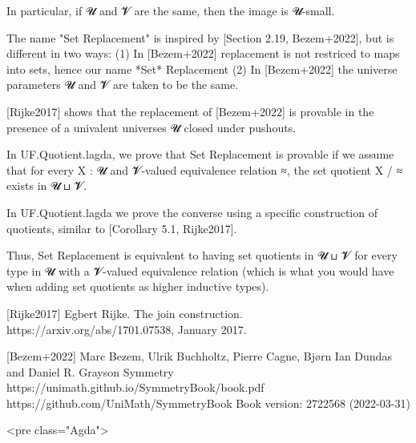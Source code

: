 In particular, if 𝓤 and 𝓥 are the same, then the image is 𝓤-small.

The name "Set Replacement" is inspired by [Section 2.19, Bezem+2022], but is
different in two ways:
(1) In [Bezem+2022] replacement is not restriced to maps into sets, hence our
    name *Set* Replacement
(2) In [Bezem+2022] the universe parameters 𝓤 and 𝓥 are taken to be the same.

[Rijke2017] shows that the replacement of [Bezem+2022] is provable in the
presence of a univalent universes 𝓤 closed under pushouts.

In UF.Quotient.lagda, we prove that Set Replacement is provable if we assume
that for every X : 𝓤 and 𝓥-valued equivalence relation ≈, the set quotient X / ≈
exists in 𝓤 ⊔ 𝓥.

In UF.Quotient.lagda we prove the converse using a specific construction of
quotients, similar to [Corollary 5.1, Rijke2017].

Thus, Set Replacement is equivalent to having set quotients in 𝓤 ⊔ 𝓥 for every
type in 𝓤 with a 𝓥-valued equivalence relation (which is what you would have
when adding set quotients as higher inductive types).

[Rijke2017]  Egbert Rijke. The join construction.
             https://arxiv.org/abs/1701.07538, January 2017.

[Bezem+2022] Marc Bezem, Ulrik Buchholtz, Pierre Cagne, Bj‌ørn Ian Dundas and
             Daniel R. Grayson
             Symmetry
             https://unimath.github.io/SymmetryBook/book.pdf
             https://github.com/UniMath/SymmetryBook
             Book version: 2722568 (2022-03-31)

<pre class="Agda">

